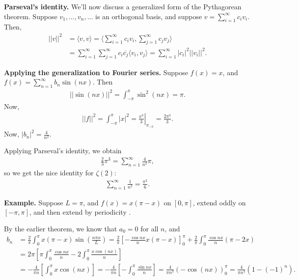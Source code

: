\documentclass{article}
\newcommand{\ol}{\overline}
\begin{document}
{\bf Parseval's identity.} We'll now discuss a generalized form of the Pythagorean theorem.  Suppose $v_1, \dots, v_n, \dots$ is an orthogonal basis, and suppose $v = \sum_{i=1}^{\infty} c_i v_i$.  Then,
\begin{align*}
  ||v||^2 &= \langle v, v\rangle = \langle \sum_{i=1}^{\infty} c_i v_i, \sum_{j=1}^{\infty} c_j v_j \rangle \\
  &= \sum_{i=1}^{\infty} \sum_{j=1}^{\infty} c_i \ol{c_j} \langle v_i, v_j\rangle = \sum_{i=1}^{\infty} |c_i|^2 ||v_i||^2.
\end{align*}

{\bf Applying the generalization to Fourier series.}  Suppose $f(x) = x$, and $f(x) = \sum_{n=1}^{\infty} b_n \sin (nx)$.  Then
\begin{align*}
  || \sin (nx) ||^2 = \int_{- \pi}^{\pi} \sin^2 (nx) = \pi.
\end{align*}
Now,
\begin{align*}
  ||f||^2 = \int_{- \pi}^{\pi} |x|^2 = \left . \frac{x^3}{3} \right |_{\pi}_{- \pi} = \frac{2 \pi^3}{3}.
\end{align*}
Now, $|b_n|^2 = \frac{4}{n^2}$.

Applying Parseval's identity, we obtain
\begin{align*}
  \frac{2}{3} \pi^3 = \sum_{n=1}^{\infty} \frac{4}{n^2} \pi,
\end{align*}
so we get the nice identity for $\zeta(2)$:
\begin{align*}
  \sum_{n=1}^{\infty} \frac{1}{n^2} = \frac{\pi^2}{6}.
\end{align*}

{\bf Example.} Suppose $L = \pi$, and $f(x) = x (\pi - x)$ on $[0, \pi]$, extend oddly on $[-\pi, \pi]$, and then extend by periodicity
.

By the earlier theorem, we know that $a_0 = 0$ for all $n$, and
\begin{align*}
  b_n &= \frac{2}{\pi} \int_{0}^{\pi} x(\pi - x) \sin \left( \frac{n \pi x}{L} \right) = \frac{2}{\pi} \left[ - \frac{\cos nx}{n} x(\pi - x) \right]_{0}^{\pi} + \frac{2}{\pi} \int_{0}^{\pi} \frac{\cos nx}{n} (\pi - 2x) \\
  &= 2 \pi \left[ \pi \int_{0}^{\pi} \frac{\cos nx}{n} - 2 \int_{0}^{\pi} \frac{x \cos (nx)}{n} \right] \\
  &= - \frac{4}{\pi n} \left[ \int_{0}^{\pi} x \cos (nx) \right] = - \frac{4}{\pi n} \left[  -\int_{0}^{\pi} \frac{\sin nx}{n} \right ] = \frac{4}{\pi n^3} \left( - \cos (nx) \right)_{0}^{\pi} = \frac{4}{\pi n^3} \left( 1 - (-1)^n \right).
\end{align*}
\end{document}
